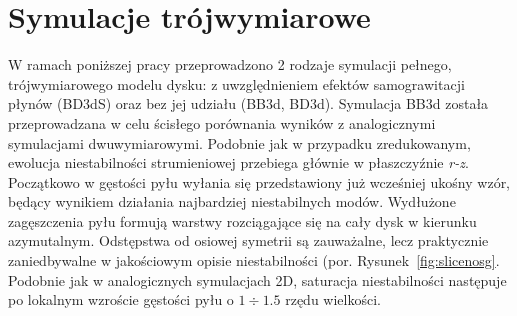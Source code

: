 \section{Symulacje trójwymiarowe}
W ramach poniższej pracy przeprowadzono 2 rodzaje symulacji pełnego,
trójwymiarowego modelu dysku: z uwzględnieniem efektów samograwitacji płynów
(BD3dS) oraz bez jej udziału (BB3d, BD3d). Symulacja BB3d została przeprowadzana
w celu ścisłego porównania wyników z analogicznymi symulacjami dwuwymiarowymi.
Podobnie jak w przypadku zredukowanym, ewolucja niestabilności strumieniowej
przebiega głównie w płaszczyźnie \textit{r-z}. Początkowo w gęstości pyłu
wyłania się przedstawiony już wcześniej ukośny wzór, będący wynikiem działania
najbardziej niestabilnych modów. Wydłużone zagęszczenia pyłu formują warstwy
rozciągające się na cały dysk w kierunku azymutalnym. Odstępstwa od osiowej
symetrii są zauważalne, lecz praktycznie zaniedbywalne w jakościowym opisie
niestabilności (por. Rysunek~\ref{fig:slicenosg}. Podobnie jak w analogicznych
symulacjach 2D, saturacja niestabilności następuje po lokalnym wzroście gęstości
pyłu o $1\div1.5$ rzędu wielkości.
%
